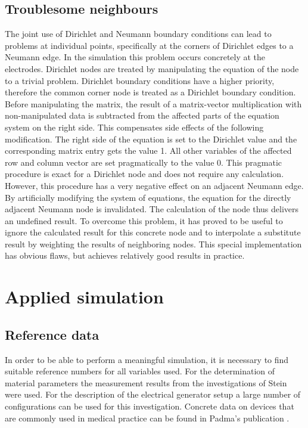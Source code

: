 \documentclass[parskip=half, titlepage=yes, 12pt, BCOR=12mm, DIV=calc]{scrartcl}
\begin{document}
\subsection{Troublesome neighbours}
The joint use of Dirichlet and Neumann boundary conditions can lead to problems at individual points, specifically at the corners of Dirichlet edges to a Neumann edge. In the simulation this problem occurs concretely at the electrodes. Dirichlet nodes are treated by manipulating the equation of the node to a trivial problem. Dirichlet boundary conditions have a higher priority, therefore the common corner node is treated as a Dirichlet boundary condition. Before manipulating the matrix, the result of a matrix-vector multiplication with non-manipulated data is subtracted from the affected parts of the equation system on the right side. This compensates side effects of the following modification. The right side of the equation is set to the Dirichlet value and the corresponding matrix entry gets the value 1. All other variables of the affected row and column vector are set pragmatically to the value 0. This pragmatic procedure is exact for a Dirichlet node and does not require any calculation. However, this procedure has a very negative effect on an adjacent Neumann edge. By artificially modifying the system of equations, the equation for the directly adjacent Neumann node is invalidated. The calculation of the node thus delivers an undefined result. To overcome this problem, it has proved to be useful to ignore the calculated result for this concrete node and to interpolate a substitute result by weighting the results of neighboring nodes. This special implementation has obvious flaws, but achieves relatively good results in practice.





\section{Applied simulation}

\subsection{Reference data}
In order to be able to perform a meaningful simulation, it is necessary to find suitable reference numbers for all variables used. For the determination of material parameters the measurement results from the investigations of Stein \cite{stein} were used. For the description of the electrical generator setup a large number of configurations can be used for this investigation. Concrete data on devices that are commonly used in medical practice can be found in Padma's publication \cite{padma}. 
\end{document}
